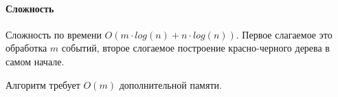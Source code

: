 \documentclass[12pt]{article}
\begin{document}
% 
% 


\paragraph{Сложность}
Сложность по времени $ O(m \cdot log(n) + n \cdot log(n)) $.
Первое слагаемое это обработка $ m $ событий, второе слогаемое построение
красно-черного дерева в самом начале.

Алгоритм требует $ O(m) $ дополнительной памяти.
\end{document}
